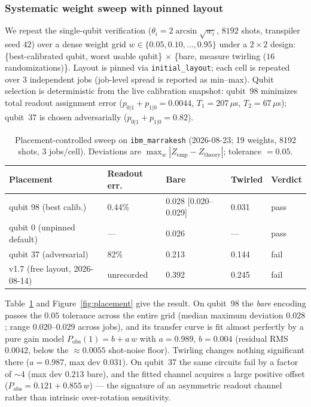﻿\documentclass[12pt,a4paper]{article}
\begin{document}
\subsubsection{Systematic weight sweep with pinned layout}\label{sec:sweep}

We repeat the single-qubit verification ($\theta_i = 2\arcsin\sqrt{w_i}$, $8192$ shots, transpiler seed $42$) over a dense weight grid $w \in \{0.05, 0.10, \ldots, 0.95\}$ under a $2\times 2$ design: \{best-calibrated qubit, worst usable qubit\} $\times$ \{bare, measure twirling ($16$ randomizations)\}. Layout is pinned via \texttt{initial\_layout}; each cell is repeated over $3$ independent jobs (job-level spread is reported as min--max). Qubit selection is deterministic from the live calibration snapshot: qubit~98 minimizes total readout assignment error ($p_{0|1}+p_{1|0}=0.0044$, $T_1=207\,\mu$s, $T_2=67\,\mu$s); qubit~37 is chosen adversarially ($p_{0|1}+p_{1|0}=0.82$).

\begin{table}[H]
\centering
\caption{Placement-controlled sweep on \texttt{ibm\_marrakesh} (2026-08-23; 19 weights, 8192 shots, 3 jobs/cell). Deviations are $\max_w |Z_{\mathrm{emp}} - Z_{\mathrm{theory}}|$; tolerance $=0.05$.}
\label{tab:placement}
\small
\begin{tabular}{@{}lllll@{}}
\hline
Placement & Readout err. & Bare & Twirled & Verdict \\
\hline
qubit 98 (best calib.) & 0.44\% & 0.028 [0.020--0.029] & 0.031 & pass \\
qubit 0 (unpinned default) & --- & 0.026 & --- & pass \\
qubit 37 (adversarial) & 82\% & 0.213 & 0.144 & fail \\
v1.7 (free layout, 2026-08-14) & unrecorded & 0.392 & 0.245 & fail \\
\hline
\end{tabular}
\end{table}

Table~\ref{tab:placement} and Figure~\ref{fig:placement} give the result. On qubit~98 the \emph{bare} encoding passes the $0.05$ tolerance across the entire grid (median maximum deviation $0.028$; range $0.020$--$0.029$ across jobs), and its transfer curve is fit almost perfectly by a pure gain model $P_{\mathrm{obs}}(1) = b + a\,w$ with $a = 0.989$, $b = 0.004$ (residual RMS $0.0042$, below the $\approx 0.0055$ shot-noise floor). Twirling changes nothing significant there ($a=0.987$, max dev $0.031$). On qubit~37 the same circuits fail by a factor of $\sim$4 (max dev $0.213$ bare), and the fitted channel acquires a large positive offset ($P_{\mathrm{obs}} = 0.121 + 0.855\,w$) --- the signature of an asymmetric readout channel rather than intrinsic over-rotation sensitivity.
\end{document}
